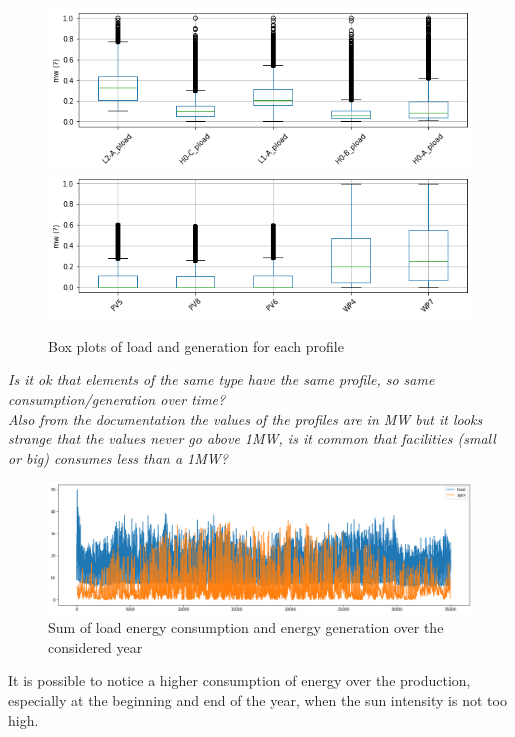 \begin{figure}[H]
\centering
    \includegraphics[width=.9\linewidth]{images/MVOberr/BoxPlotLoad.png}
    \includegraphics[width=.9\linewidth]{images/MVOberr/BoxPlotRes.png}
\caption{Box plots of load and generation for each profile}
\label{fig:gym_anm_net}
\end{figure}

\emph{Is it ok that elements of the same type have the same profile, so same consumption/generation over time?} \\
\emph{Also from the documentation the values of the profiles are in MW but it looks strange that the values never go above 1MW, is it common that facilities (small or big) consumes less than a 1MW?}

\begin{figure}[h]
\centering
    \includegraphics[width=.9\linewidth]{images/MVOberr/Load&Gens.png}
\caption{Sum of load energy consumption and energy generation over the considered year}
\label{fig:gym_anm_net}
\end{figure}

It is possible to notice a higher consumption of energy over the production, especially at the beginning and end of the year, when the sun intensity is not too high.

